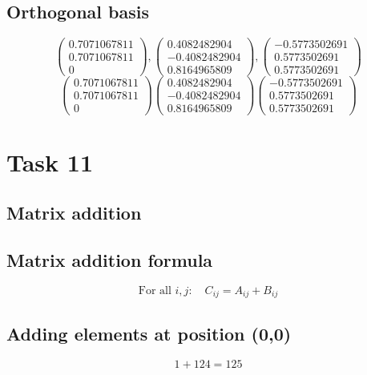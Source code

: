 \documentclass{article}
\begin{document}
\subsection*{ \vspace{1em} Orthogonal basis}
\[
\begin{pmatrix}0.7071067811 \\ 0.7071067811 \\ 0\end{pmatrix}, \begin{pmatrix}0.4082482904 \\ -0.4082482904 \\ 0.8164965809\end{pmatrix}, \begin{pmatrix}-0.5773502691 \\ 0.5773502691 \\ 0.5773502691\end{pmatrix}
\]
\[
\begin{pmatrix}0.7071067811 \\ 0.7071067811 \\ 0\end{pmatrix}
\begin{pmatrix}0.4082482904 \\ -0.4082482904 \\ 0.8164965809\end{pmatrix}
\begin{pmatrix}-0.5773502691 \\ 0.5773502691 \\ 0.5773502691\end{pmatrix}
\]
\bigskip

\hrulefill
\bigskip

\section*{Task 11}

\subsection*{Matrix addition}
\subsection*{ \vspace{1em} Matrix addition formula}
\[
\text{For all } i,j: \quad C_{ij} = A_{ij} + B_{ij}
\]
\subsection*{ \vspace{1em} Adding elements at position (0,0)}
\[
1 + 124 = 125
\]
\end{document}
